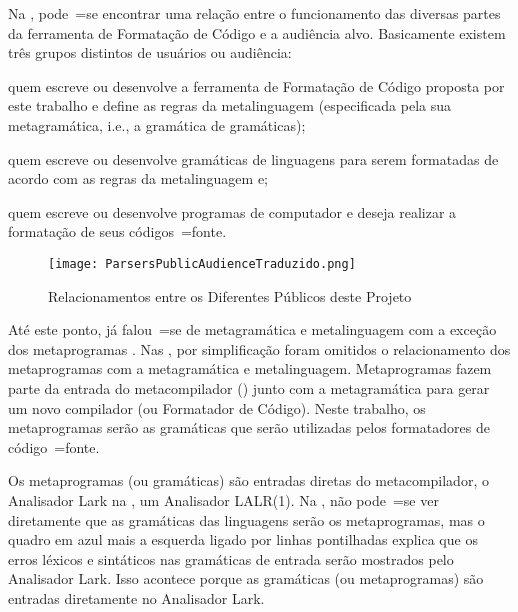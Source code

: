 Na ,
pode~=se encontrar uma relação entre o funcionamento das diversas partes da ferramenta de Formatação de Código e
a audiência alvo.
Basicamente existem três grupos distintos de usuários ou
audiência:
\begin{inparaenum}[1)]
\item quem escreve ou
desenvolve a ferramenta de Formatação de Código proposta por este trabalho e
define as regras da metalinguagem (especificada pela sua metagramática,
i.e.,
a gramática de gramáticas);
\item quem escreve ou
desenvolve gramáticas de linguagens para serem formatadas de acordo com as regras da metalinguagem e;
\item quem escreve ou
desenvolve programas de computador e
deseja realizar a formatação de seus códigos~=fonte.
\end{inparaenum}%
\begin{figure}[!htb]
\caption{Relacionamentos entre os Diferentes Públicos deste Projeto}
\label{ParsersPublicAudienceTraduzido}
\centering
\texttt{[image: ParsersPublicAudienceTraduzido.png]}
\end{figure}

Até este ponto,
já falou~=se de metagramática e
metalinguagem com a exceção dos metaprogramas \cite{tradeoffsInMetaprogramming}.
Nas ,
por simplificação foram omitidos o relacionamento dos metaprogramas com a metagramática e
metalinguagem.
Metaprogramas fazem parte da entrada do metacompilador () junto com a metagramática para gerar um novo compilador (ou Formatador de Código).
Neste trabalho,
os metaprogramas serão as gramáticas que serão utilizadas pelos formatadores de código~=fonte.

Os metaprogramas (ou gramáticas) são entradas diretas do metacompilador,
o Analisador Lark na ,
um Analisador LALR(1).
Na ,
não pode~=se ver diretamente que as gramáticas das linguagens serão os metaprogramas,
mas o quadro em azul mais a esquerda ligado por linhas pontilhadas explica que os erros léxicos e
sintáticos nas gramáticas de entrada serão mostrados pelo Analisador Lark.
Isso acontece porque as gramáticas (ou metaprogramas) são entradas diretamente no Analisador Lark.

